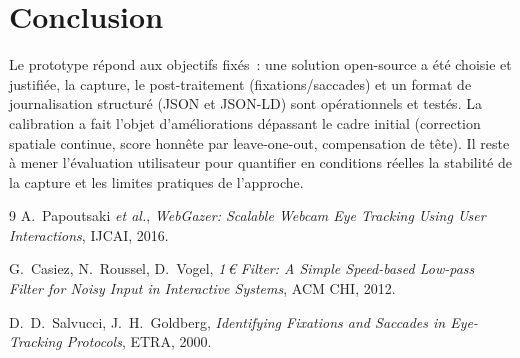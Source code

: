 \documentclass[11pt,a4paper]{article}
\begin{document}
\section{Conclusion}

Le prototype répond aux objectifs fixés~: une solution open-source a été choisie et
justifiée, la capture, le post-traitement (fixations/saccades) et un format de
journalisation structuré (JSON et JSON-LD) sont opérationnels et testés. La
calibration a fait l'objet d'améliorations dépassant le cadre initial (correction
spatiale continue, score honnête par leave-one-out, compensation de tête). Il reste
à mener l'évaluation utilisateur pour quantifier en conditions réelles la
stabilité de la capture et les limites pratiques de l'approche.

\begin{thebibliography}{9}
A.~Papoutsaki \emph{et al.},
\textit{WebGazer: Scalable Webcam Eye Tracking Using User Interactions},
IJCAI, 2016.

G.~Casiez, N.~Roussel, D.~Vogel,
\textit{1\,€ Filter: A Simple Speed-based Low-pass Filter for Noisy Input in
Interactive Systems}, ACM CHI, 2012.

D.~D.~Salvucci, J.~H.~Goldberg,
\textit{Identifying Fixations and Saccades in Eye-Tracking Protocols},
ETRA, 2000.
\end{thebibliography}
\end{document}
